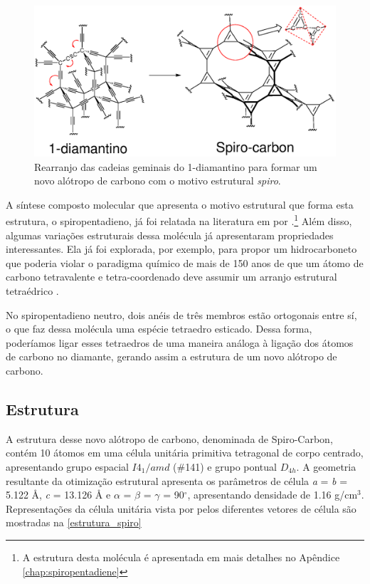 	\begin{figure}[ht]
		\centering
		\includegraphics[width=1\linewidth]{capitulos/fig/results1/estrutura_1diamantino-spiro.eps}
		\caption{Rearranjo das cadeias geminais do 1-diamantino para formar um novo alótropo de carbono com o motivo estrutural \textit{spiro}.}
		\label{soliton}
	\end{figure}

	A síntese composto molecular que apresenta o motivo estrutural que forma esta estrutura, o spiropentadieno, já foi relatada na literatura em \citeyear{billups1991spiropentadiene} por \citeauthor{billups1991spiropentadiene}.\footnote{A estrutura desta molécula é apresentada em mais detalhes no Apêndice \autoref{chap:spiropentadiene}} Além disso, algumas variações estruturais dessa molécula já apresentaram propriedades interessantes. Ela já foi explorada, por exemplo, para propor um hidrocarboneto que poderia violar o paradigma químico de mais de 150 anos de que um átomo de carbono tetravalente e tetra-coordenado deve assumir um arranjo estrutural tetraédrico \cite{esteves2005neutral}. 
	
	No spiropentadieno neutro, dois anéis de três membros estão ortogonais entre sí, o que faz dessa molécula uma espécie tetraedro esticado. Dessa forma, poderíamos ligar esses tetraedros de uma maneira análoga à ligação dos átomos de carbono no diamante, gerando assim a estrutura de um novo alótropo de carbono.

	\subsection{Estrutura}

	A estrutura desse novo alótropo de carbono, denominada de Spiro-Carbon, contém 10 átomos em uma célula unitária primitiva tetragonal de corpo centrado, apresentando grupo espacial $I4_1/amd$ (\#141) e grupo pontual $D_{4h}$. A geometria resultante da otimização estrutural apresenta os parâmetros de célula \textit{a} = \textit{b} = 5.122 Å, \textit{c} = 13.126 Å e $\alpha$ = $\beta$ = $\gamma$ = 90$^\circ$, apresentando densidade de 1.16 g/cm$^3$. Representações da célula unitária vista por pelos diferentes vetores de célula são mostradas na \autoref{estrutura_spiro}
	
